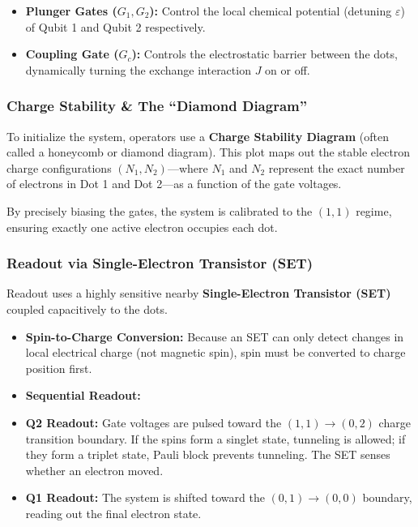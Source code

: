 \documentclass[
]{article}
\providecommand{\tightlist}{%
  \setlength{\itemsep}{0pt}\setlength{\parskip}{0pt}}
\begin{document}
\begin{itemize}
\tightlist
\item
  \textbf{Plunger Gates (\(G_1, G_2\)):} Control the local chemical
  potential (detuning \(\varepsilon\)) of Qubit 1 and Qubit 2
  respectively.
\item
  \textbf{Coupling Gate (\(G_c\)):} Controls the electrostatic barrier
  between the dots, dynamically turning the exchange interaction \(J\)
  on or off.
\end{itemize}

\subsubsection{Charge Stability \& The ``Diamond
Diagram''}\label{charge-stability-the-diamond-diagram}

To initialize the system, operators use a \textbf{Charge Stability
Diagram} (often called a honeycomb or diamond diagram). This plot maps
out the stable electron charge configurations \((N_1, N_2)\)---where
\(N_1\) and \(N_2\) represent the exact number of electrons in Dot 1 and
Dot 2---as a function of the gate voltages.

By precisely biasing the gates, the system is calibrated to the
\((1,1)\) regime, ensuring exactly one active electron occupies each
dot.

\subsubsection{Readout via Single-Electron Transistor
(SET)}\label{readout-via-single-electron-transistor-set}

Readout uses a highly sensitive nearby \textbf{Single-Electron
Transistor (SET)} coupled capacitively to the dots.

\begin{itemize}
\tightlist
\item
  \textbf{Spin-to-Charge Conversion:} Because an SET can only detect
  changes in local electrical charge (not magnetic spin), spin must be
  converted to charge position first.
\item
  \textbf{Sequential Readout:}
\item
  \textbf{Q2 Readout:} Gate voltages are pulsed toward the
  \((1,1) \rightarrow (0,2)\) charge transition boundary. If the spins
  form a singlet state, tunneling is allowed; if they form a triplet
  state, Pauli block prevents tunneling. The SET senses whether an
  electron moved.
\item
  \textbf{Q1 Readout:} The system is shifted toward the
  \((0,1) \rightarrow (0,0)\) boundary, reading out the final electron
  state.
\end{itemize}
\end{document}
